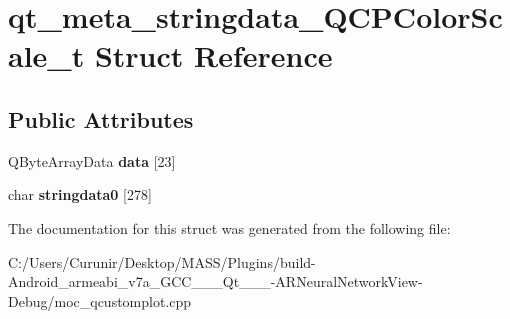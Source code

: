 \hypertarget{structqt__meta__stringdata___q_c_p_color_scale__t}{}\section{qt\+\_\+meta\+\_\+stringdata\+\_\+\+Q\+C\+P\+Color\+Scale\+\_\+t Struct Reference}
\label{structqt__meta__stringdata___q_c_p_color_scale__t}
\subsection*{Public Attributes}
\begin{DoxyCompactItemize}
\item 
\mbox{\label{structqt__meta__stringdata___q_c_p_color_scale__t_afca49a2ef4f897a520ebdb366cf142bc}} 
Q\+Byte\+Array\+Data {\bfseries data} \mbox{[}23\mbox{]}
\item 
\mbox{\label{structqt__meta__stringdata___q_c_p_color_scale__t_a7472255b684c2f1678bd0fe045913a83}} 
char {\bfseries stringdata0} \mbox{[}278\mbox{]}
\end{DoxyCompactItemize}


The documentation for this struct was generated from the following file\+:\begin{DoxyCompactItemize}
\item 
C\+:/\+Users/\+Curunir/\+Desktop/\+M\+A\+S\+S/\+Plugins/build-\/\+Android\+\_\+armeabi\+\_\+v7a\+\_\+\+G\+C\+C\+\_\+\_\+\_\+\+Qt\+\_\+\_\+\_-\/\+A\+R\+Neural\+Network\+View-\/\+Debug/moc\+\_\+qcustomplot.\+cpp\end{DoxyCompactItemize}
